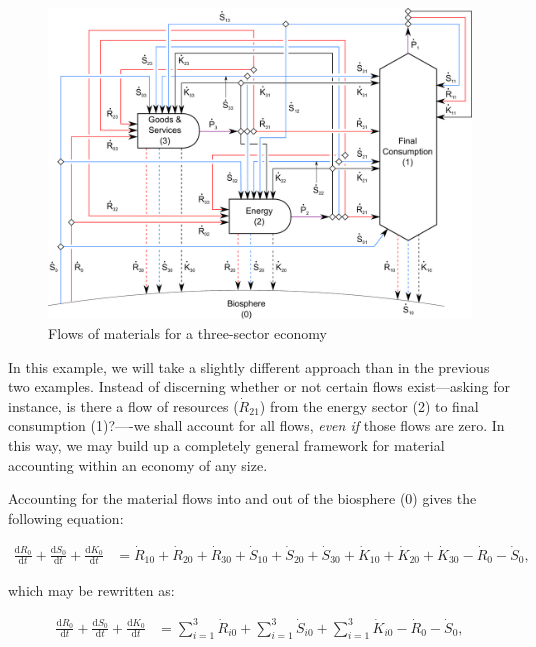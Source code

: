 \begin{figure}[!ht]
\centering
\includegraphics[width=0.8\linewidth]{Part_1/Chapter_Materials/images/3_sector_materials.pdf}
\caption[Flows of materials for a three-sector economy]{Flows of materials for a three-sector economy}
\label{fig:C_materials}
\end{figure}

In this example, we will take a slightly different approach
than in the previous two examples. 
Instead of discerning whether or not certain flows exist---asking for instance,
is there a flow of resources ($\dot{R}_{21}$) from
the energy sector (2) to final consumption (1)?----we
shall account for all flows,
\emph{even if} those flows are zero.
In this way,
we may build up a completely general
framework for material accounting within an economy
of any size.

Accounting for the material flows 
into and out of the biosphere 
(0) gives the following equation:

\begin{align} \label{eq:C_CV_0}
	\frac{\mathrm{d}R_{0}}{\mathrm{d}t} 
	+ \frac{\mathrm{d}S_{0}}{\mathrm{d}t}	
	+ \frac{\mathrm{d}K_0}{\mathrm{d}t}		
	& =  \dot{R}_{10} + \dot{R}_{20} + \dot{R}_{30}
	+ \dot{S}_{10} + \dot{S}_{20} + \dot{S}_{30}
	+ \dot{K}_{10} + \dot{K}_{20} + \dot{K}_{30}
	- \dot{R}_{0} 
	- \dot{S}_{0},
\end{align}

\noindent which may be rewritten as:

\begin{align} \label{eq:C_CV_0_b}
	\frac{\mathrm{d}R_{0}}{\mathrm{d}t} 
	+ \frac{\mathrm{d}S_{0}}{\mathrm{d}t}	
	+ \frac{\mathrm{d}K_0}{\mathrm{d}t}		
	& =  \sum_{i = 1}^{3}\dot{R}_{i0}
	+ \sum_{i = 1}^{3}\dot{S}_{i0}
	+ \sum_{i = 1}^{3}\dot{K}_{i0}
	- \dot{R}_{0} 
	- \dot{S}_{0},
\end{align}

